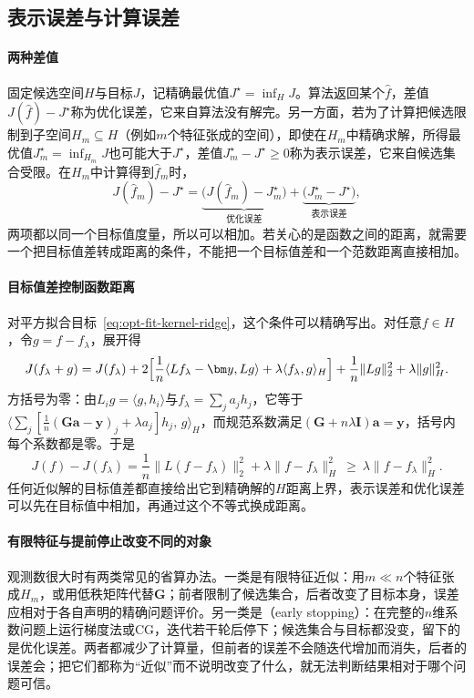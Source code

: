 \subsection{表示误差与计算误差}
\label{sec:opt-fit-representation-computation}

\paragraph{两种差值}
固定候选空间$H$与目标$J$，记精确最优值$J^\star=\inf_HJ$。算法返回某个$\hat f$，差值$J(\hat f)-J^\star$称为优化误差，它来自算法没有解完。另一方面，若为了计算把候选限制到子空间$H_m\subseteq H$（例如$m$个特征张成的空间），即使在$H_m$中精确求解，所得最优值$J_m^\star=\inf_{H_m}J$也可能大于$J^\star$，差值$J_m^\star-J^\star\ge0$称为表示误差，它来自候选集合受限。在$H_m$中计算得到$\hat f_m$时，
\[
  J(\hat f_m)-J^\star=\underbrace{\bigl(J(\hat f_m)-J_m^\star\bigr)}_{\text{优化误差}}+\underbrace{\bigl(J_m^\star-J^\star\bigr)}_{\text{表示误差}},
\]
两项都以同一个目标值度量，所以可以相加。若关心的是函数之间的距离，就需要一个把目标值差转成距离的条件，不能把一个目标值差和一个范数距离直接相加。

\paragraph{目标值差控制函数距离}
对平方拟合目标~\eqref{eq:opt-fit-kernel-ridge}，这个条件可以精确写出。对任意$f\in H$，令$g=f-f_\lambda$，展开得
\[
  J(f_\lambda+g)=J(f_\lambda)+2\Bigl[\frac1n\langle Lf_\lambda-\bm y,Lg\rangle+\lambda\langle f_\lambda,g\rangle_H\Bigr]+\frac1n\|Lg\|_2^2+\lambda\|g\|_H^2 .
\]
方括号为零：由$L_ig=\langle g,h_i\rangle$与$f_\lambda=\sum_ja_jh_j$，它等于$\bigl\langle\sum_j[\tfrac1n(\bm G\bm a-\bm y)_j+\lambda a_j]h_j,\,g\bigr\rangle_H$，而规范系数满足$(\bm G+n\lambda\bm I)\bm a=\bm y$，括号内每个系数都是零。于是
\begin{equation}
  J(f)-J(f_\lambda)=\frac1n\|L(f-f_\lambda)\|_2^2+\lambda\|f-f_\lambda\|_H^2\ \ge\ \lambda\|f-f_\lambda\|_H^2 .
  \label{eq:opt-fit-objective-gap}
\end{equation}
任何近似解的目标值差都直接给出它到精确解的$H$距离上界，表示误差和优化误差可以先在目标值中相加，再通过这个不等式换成距离。

\paragraph{有限特征与提前停止改变不同的对象}
观测数很大时有两类常见的省算办法。一类是有限特征近似：用$m\ll n$个特征张成$H_m$，或用低秩矩阵代替$\bm G$；前者限制了候选集合，后者改变了目标本身，误差应相对于各自声明的精确问题评价。另一类是（early stopping）：在完整的$n$维系数问题上运行梯度法或CG，迭代若干轮后停下；候选集合与目标都没变，留下的是优化误差。两者都减少了计算量，但前者的误差不会随迭代增加而消失，后者的误差会；把它们都称为“近似”而不说明改变了什么，就无法判断结果相对于哪个问题可信。

